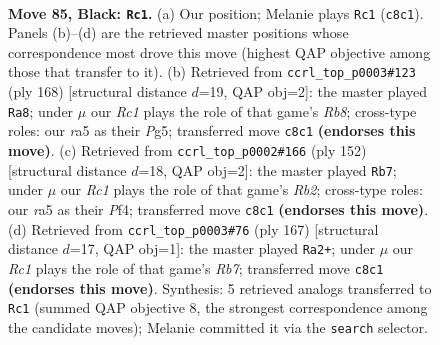 \documentclass[11pt]{article}
\begin{document}
\clearpage

\begin{figure}[p]\centering
\begin{subfigure}{0.46\textwidth}\centering
\resizebox{\linewidth}{!}{%
\newchessgame
\chessboard[
  setfen={2r5/5pk1/4p3/R7/P3P3/5P2/1R5K/8 b - - 62 85},
  showmover=false,
  pgfstyle=straightmove, color=movearrow, markmove={c8-c1}
]}
\caption{}
\end{subfigure}\hfill
\begin{subfigure}{0.46\textwidth}\centering
\resizebox{\linewidth}{!}{%
\newchessgame
\chessboard[
  setfen={1R6/2r3k1/6p1/6Pp/7P/5P2/6K1/8 w - - 83 85},
  showmover=false,
  pgfstyle=straightmove, color=movearrow, markmove={b8-a8}
]}
\caption{}
\end{subfigure}
\\[4pt]
\begin{subfigure}{0.46\textwidth}\centering
\resizebox{\linewidth}{!}{%
\newchessgame
\chessboard[
  setfen={8/8/r4kp1/7p/5P2/6PK/1R6/8 w - - 2 77},
  showmover=false,
  pgfstyle=straightmove, color=movearrow, markmove={b2-b7}
]}
\caption{}
\end{subfigure}\hfill
\begin{subfigure}{0.46\textwidth}\centering
\resizebox{\linewidth}{!}{%
\newchessgame
\chessboard[
  setfen={R7/P4kp1/7p/K6P/8/8/1r6/8 b - - 10 84},
  showmover=false,
  pgfstyle=straightmove, color=movearrow, markmove={b2-a2}
]}
\caption{}
\end{subfigure}
\caption{\textbf{Move 85, Black: \texttt{Rc1}.} (a) Our position; Melanie plays \texttt{Rc1} (\texttt{c8c1}). Panels (b)--(d) are the retrieved master positions whose correspondence most drove this move (highest QAP objective among those that transfer to it). (b) Retrieved from \texttt{ccrl\_top\_p0003\#123} (ply 168) [structural distance $d$=19, QAP obj=2]: the master played \texttt{Ra8}; under $\mu$ our \emph{Rc1} plays the role of that game's \emph{Rb8}; cross-type roles: our \emph{r}a5 as their \emph{P}g5; transferred move \texttt{c8c1} \textbf{(endorses this move)}. (c) Retrieved from \texttt{ccrl\_top\_p0002\#166} (ply 152) [structural distance $d$=18, QAP obj=2]: the master played \texttt{Rb7}; under $\mu$ our \emph{Rc1} plays the role of that game's \emph{Rb2}; cross-type roles: our \emph{r}a5 as their \emph{P}f4; transferred move \texttt{c8c1} \textbf{(endorses this move)}. (d) Retrieved from \texttt{ccrl\_top\_p0003\#76} (ply 167) [structural distance $d$=17, QAP obj=1]: the master played \texttt{Ra2+}; under $\mu$ our \emph{Rc1} plays the role of that game's \emph{Rb7}; transferred move \texttt{c8c1} \textbf{(endorses this move)}. Synthesis: 5 retrieved analogs transferred to \texttt{Rc1} (summed QAP objective 8, the strongest correspondence among the candidate moves); Melanie committed it via the \texttt{search} selector.}
\label{fig:thought-m169}
\end{figure}
\end{document}
